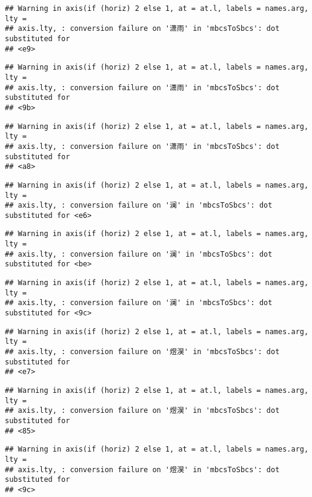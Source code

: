 \documentclass[
]{article}
\begin{document}
\begin{verbatim}
## Warning in axis(if (horiz) 2 else 1, at = at.l, labels = names.arg, lty =
## axis.lty, : conversion failure on '潇雨' in 'mbcsToSbcs': dot substituted for
## <e9>
\end{verbatim}

\begin{verbatim}
## Warning in axis(if (horiz) 2 else 1, at = at.l, labels = names.arg, lty =
## axis.lty, : conversion failure on '潇雨' in 'mbcsToSbcs': dot substituted for
## <9b>
\end{verbatim}

\begin{verbatim}
## Warning in axis(if (horiz) 2 else 1, at = at.l, labels = names.arg, lty =
## axis.lty, : conversion failure on '潇雨' in 'mbcsToSbcs': dot substituted for
## <a8>
\end{verbatim}

\begin{verbatim}
## Warning in axis(if (horiz) 2 else 1, at = at.l, labels = names.arg, lty =
## axis.lty, : conversion failure on '澜' in 'mbcsToSbcs': dot substituted for <e6>
\end{verbatim}

\begin{verbatim}
## Warning in axis(if (horiz) 2 else 1, at = at.l, labels = names.arg, lty =
## axis.lty, : conversion failure on '澜' in 'mbcsToSbcs': dot substituted for <be>
\end{verbatim}

\begin{verbatim}
## Warning in axis(if (horiz) 2 else 1, at = at.l, labels = names.arg, lty =
## axis.lty, : conversion failure on '澜' in 'mbcsToSbcs': dot substituted for <9c>
\end{verbatim}

\begin{verbatim}
## Warning in axis(if (horiz) 2 else 1, at = at.l, labels = names.arg, lty =
## axis.lty, : conversion failure on '煜淏' in 'mbcsToSbcs': dot substituted for
## <e7>
\end{verbatim}

\begin{verbatim}
## Warning in axis(if (horiz) 2 else 1, at = at.l, labels = names.arg, lty =
## axis.lty, : conversion failure on '煜淏' in 'mbcsToSbcs': dot substituted for
## <85>
\end{verbatim}

\begin{verbatim}
## Warning in axis(if (horiz) 2 else 1, at = at.l, labels = names.arg, lty =
## axis.lty, : conversion failure on '煜淏' in 'mbcsToSbcs': dot substituted for
## <9c>
\end{verbatim}
\end{document}
